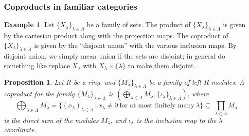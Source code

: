 \documentclass{amsart}[12pt]
\newcommand{\Hom}{\mathrm{Hom}}
\newcommand{\F}{\mathbb{F}}
\numberwithin{equation}{section}
\theoremstyle{plain} %
\newtheorem{prop}[equation]{Proposition}
\theoremstyle{definition}
\newtheorem{ex}[equation]{Example}
\theoremstyle{remark}
\newtheorem{rem}[equation]{Remark}
\newcommand{\sssec}[1]{\subsubsection{#1}}
\newcommand{\Fld}{\mathbf{Fld}}
\begin{document}



\sssec{Coproducts in familiar categories}



\begin{ex} Let $\{X_\lambda\}_{\lambda\in \Lambda}$ be a family of sets. The product of $\{X_\lambda\}_{\lambda\in \Lambda}$ is given by the cartesian product along with the projection maps. The coproduct of $\{X_\lambda\}_{\lambda\in \Lambda}$ is given by the ``disjoint union'' with the various inclusion maps. By disjoint union, we simply mean union if the sets are disjoint; in general do something like replace $X_\lambda$ with $X_\lambda \times \{\lambda\}$ to make them disjoint.
\end{ex}




\begin{prop} Let $R$ be a ring, and $\{M_\lambda\}_{\lambda\in \Lambda}$ be a family of left $R$-modules. A coproduct for the family $\{M_\lambda\}_{\lambda\in \Lambda}$ is  $\left(\bigoplus_{\lambda \in \Lambda} M_\lambda, \{\iota_\lambda\}_{\lambda\in \Lambda}\right)$, where \[\bigoplus_{\lambda \in \Lambda} M_\lambda=\{ (x_\lambda)_{\lambda\in \Lambda} \ | \ x_\lambda\neq 0 \ \text{for at most finitely many} \ \lambda\} \subseteq \ \prod_{\lambda \in \Lambda} M_\lambda\] is the direct sum of the modules $M_\lambda$, and $\iota_\lambda$ is the inclusion map to the $\lambda$ coordinate.
\end{prop}
\end{document}
